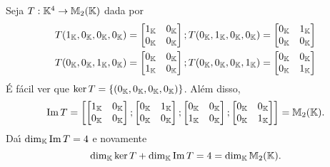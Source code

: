 \begin{exemplo}
	Seja $T : \mathbb{K}^4 \to \mathbb{M}_2(\mathbb{K})$ dada por
	\begin{align*}
		T(1_{\mathbb{K}},0_{\mathbb{K}},0_{\mathbb{K}},0_{\mathbb{K}}) &= \begin{bmatrix}
			1_{\mathbb{K}} & 0_{\mathbb{K}}\\
			0_{\mathbb{K}} & 0_{\mathbb{K}}
		\end{bmatrix}; T(0_{\mathbb{K}},1_{\mathbb{K}},0_{\mathbb{K}},0_{\mathbb{K}}) = \begin{bmatrix}
			0_{\mathbb{K}} & 1_{\mathbb{K}}\\
			0_{\mathbb{K}} & 0_{\mathbb{K}}
		\end{bmatrix}\\
		T(0_{\mathbb{K}},0_{\mathbb{K}},1_{\mathbb{K}},0_{\mathbb{K}}) &= \begin{bmatrix}
			0_{\mathbb{K}} & 0_{\mathbb{K}}\\
			1_{\mathbb{K}} & 0_{\mathbb{K}}
		\end{bmatrix}; T(0_{\mathbb{K}},0_{\mathbb{K}},0_{\mathbb{K}},1_{\mathbb{K}}) = \begin{bmatrix}
			0_{\mathbb{K}} & 0_{\mathbb{K}}\\
			0_{\mathbb{K}} & 1_{\mathbb{K}}
		\end{bmatrix}\\
	\end{align*}
	\'E f\'acil ver que $\ker T = \{(0_{\mathbb{K}},0_{\mathbb{K}},0_{\mathbb{K}},0_{\mathbb{K}})\}$. Al\'em disso,
	\[
		{\rm Im\,} T = \left[\begin{bmatrix}
			1_{\mathbb{K}} & 0_{\mathbb{K}}\\
			0_{\mathbb{K}} & 0_{\mathbb{K}}
		\end{bmatrix};\begin{bmatrix}
			0_{\mathbb{K}} & 1_{\mathbb{K}}\\
			0_{\mathbb{K}} & 0_{\mathbb{K}}
		\end{bmatrix};\begin{bmatrix}
			0_{\mathbb{K}} & 0_{\mathbb{K}}\\
			1_{\mathbb{K}} & 0_{\mathbb{K}}
		\end{bmatrix};\begin{bmatrix}
			0_{\mathbb{K}} & 0_{\mathbb{K}}\\
			0_{\mathbb{K}} & 1_{\mathbb{K}}
		\end{bmatrix}\right] = \mathbb{M}_2(\mathbb{K}).
	\]
	Da{\'\i} $\dim_{\mathbb{K}}{\rm Im\,} T = 4$ e novamente
	\[
		\dim_{\mathbb{K}}\ker T + \dim_{\mathbb{K}}{\rm Im\,} T = 4 = \dim_{\mathbb{K}}\mathbb{M}_2(\mathbb{K}).
	\]
\end{exemplo}

